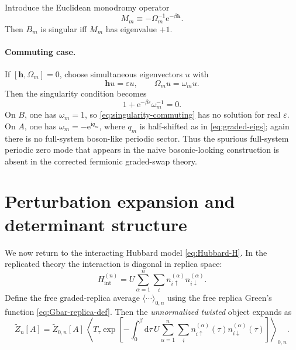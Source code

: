 \documentclass[11pt]{article}
\newcommand{\e}{\mathrm{e}}
\newcommand{\ii}{\mathrm{i}}
\newcommand{\dd}{\mathrm{d}}
\newcommand{\1}{\mathds{1}}
\newcommand{\up}{\uparrow}
\newcommand{\dn}{\downarrow}
\newcommand{\bh}{\bm{h}}
\newcommand{\sq}[1]{\left[#1\right]}
\begin{document}
Introduce the Euclidean monodromy operator
\begin{equation}
M_m\equiv -\Omega_m^{-1}\e^{-\beta\bh}.
\label{eq:Mm-def}
\end{equation}
Then $B_m$ is singular iff $M_m$ has eigenvalue $+1$.

\paragraph{Commuting case.}
If $[\bh,\Omega_m]=0$, choose simultaneous eigenvectors $u$ with
\begin{equation}
\bh u=\varepsilon u,
\qquad
\Omega_m u=\omega_m u.
\label{eq:commuting-eigenvectors}
\end{equation}
Then the singularity condition becomes
\begin{equation}
1+\e^{-\beta\varepsilon}\omega_m^{-1}=0.
\label{eq:singularity-commuting}
\end{equation}
On $B$, one has $\omega_m=1$, so \eqref{eq:singularity-commuting} has no
solution for real $\varepsilon$. On $A$, one has
$\omega_m=-\e^{\ii q_m}$, where $q_m$ is half-shifted as in
\eqref{eq:graded-eigs}; again there is no full-system boson-like periodic
sector. Thus the spurious full-system periodic zero mode that appears in the
naive bosonic-looking construction is absent in the corrected fermionic
graded-swap theory.

\section{Perturbation expansion and determinant structure}

We now return to the interacting Hubbard model \eqref{eq:Hubbard-H}. In the
replicated theory the interaction is diagonal in replica space:
\begin{equation}
H_{\mathrm{int}}^{(n)}
=
U\sum_{\alpha=1}^n\sum_i
n_{i\up}^{(\alpha)}n_{i\dn}^{(\alpha)}.
\label{eq:Hint-replica}
\end{equation}
Define the free graded-replica average $\langle\cdots\rangle_{0,n}$ using the
free replica Green's function \eqref{eq:Gbar-replica-def}. Then the
\emph{unnormalized twisted} object expands as
\begin{equation}
\widetilde Z_n[A]
=
\widetilde Z_{0,n}[A]\,
\left\langle
T_\tau \exp\sq{
-\int_0^\beta \dd\tau\,
U\sum_{\alpha=1}^n\sum_i
n_{i\up}^{(\alpha)}(\tau)n_{i\dn}^{(\alpha)}(\tau)
}
\right\rangle_{0,n}.
\label{eq:Zn-expand-start}
\end{equation}
\end{document}
